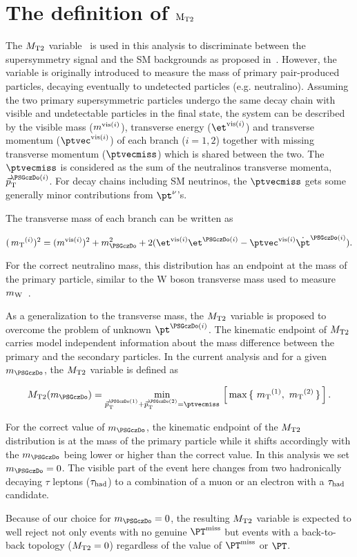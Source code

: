 \section{\texorpdfstring{The definition of $\rm {\ensuremath{{M_{\rm T2}}}}$}{The definition of MT2}}
\label{sect:mt2def}
The ${M_{\rm T2}}$ variable~\cite{Lester:1999tx,Barr:2003rg} is used in this analysis to discriminate between the supersymmetry signal and the SM backgrounds as proposed in~\cite{Barr:2009wu}. However, the variable is originally introduced to measure the mass of primary pair-produced particles, decaying eventually to undetected particles (e.g. neutralino). Assuming the two primary supersymmetric particles undergo the same decay chain with visible and undetectable particles in the final state, the system can be described by the visible mass ($m^{{\rm vis}(i)}$), transverse energy ($\etvisi$) and transverse momentum ($\vptvisi$) of each branch ($i=1,2$) together with missing transverse momentum ($\ptvecmiss$) which is shared between the two. The $\ptvecmiss$ is considered as the sum of the neutralinos transverse momenta, $\vec{p}_{\rm T}^{\PSGczDo(i)}$. For decay chains including SM neutrinos, the $\ptvecmiss$ gets some generally minor contributions from $\pt^{\nu}$'s.

The transverse mass of each branch can be written as 
\begin{linenomath}
\begin{equation}
\label{eq:mtdef}
(\mt^{(i)})^{2}= (\mvisi)^2+m^2_{\PSGczDo}+2(\etvisi\et^{\PSGczDo(i)}-\vptvisi\dot\pt^{\PSGczDo(i)}).
\end{equation}
\end{linenomath}
For the correct neutralino mass, this distribution has an endpoint at the mass of the primary particle, similar to the W boson transverse mass used to measure $m_{\rm W}$~\cite{Arnison:1983rp,Banner:1983jy,Affolder:2000bpa,Abazov:2002bu}. 

As a generalization to the transverse mass, the ${M_{\rm T2}}$ variable is proposed to overcome the problem of unknown $\pt^{\PSGczDo(i)}$. The kinematic endpoint of ${M_{\rm T2}}$ carries model independent information about the mass difference between the primary and the secondary particles. In the current analysis and for a given $m_{\PSGczDo}$, the ${M_{\rm T2}}$ variable is defined as
\begin{linenomath}
\begin{equation}
\label{eq:mt2def}
\mttwo(m_{\PSGczDo})= \min_{\vec{p}_{\rm T}^{\PSGczDo(1)}+\vec{p}_{\rm T}^{\PSGczDo(2)}=\ptvecmiss}\,\left[\,\max\,\{ \, \mt^{(1)},\,\mt^{(2)}\,\}\,\right].
\end{equation}
\end{linenomath}
For the correct value of $m_{\PSGczDo}$, the kinematic endpoint of the ${M_{\rm T2}}$ distribution is at the mass of the primary particle while it shifts accordingly with the $m_{\PSGczDo}$ being lower or higher than the correct value. In this analysis we set $m_{\PSGczDo}=0$. The visible part of the event here changes from two hadronically decaying $\tau$ leptons ($\tau_{\rm had}$) to a combination of a muon or an electron with a $\tau_{\rm had}$ candidate. 

Because of our choice for $m_{\PSGczDo}=0$, the resulting ${M_{\rm T2}}$ variable is expected to well reject not only events with no genuine $\MPT$ but events with a back-to-back topology (${M_{\rm T2}}=0$) regardless of the value of $\MPT$ or $\PT$. 
